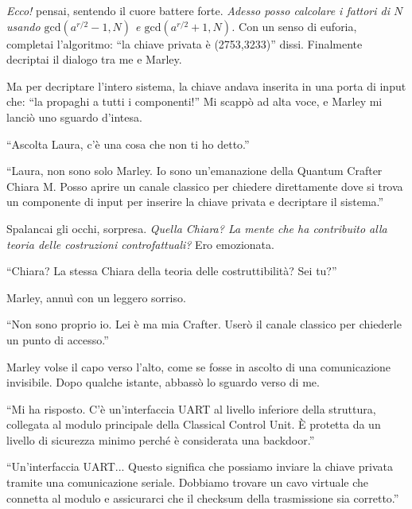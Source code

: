 \emph{Ecco!} pensai, sentendo il cuore battere forte. \emph{Adesso posso calcolare i fattori di \( N \) usando \(\text{gcd}(a^{r/2} - 1, N)\) e \(\text{gcd}(a^{r/2} + 1, N)\).} Con un senso di euforia, completai l'algoritmo: ``la chiave privata è  (2753,3233)'' dissi.
Finalmente decriptai il dialogo tra me e Marley.

Ma per decriptare l'intero sistema, la chiave andava inserita  in una porta di input che: ``la propaghi a tutti i componenti!'' Mi scappò ad alta voce, e Marley mi lanciò uno sguardo d'intesa.
\begin{dialogue}
 \enquote{Ascolta Laura, c'è una cosa che non ti ho detto.}
\end{dialogue}

\begin{dialogue}
 \enquote{Laura, non sono solo Marley. Io sono un'emanazione della Quantum Crafter Chiara M. Posso aprire un canale classico per chiedere direttamente dove si trova un componente di input per inserire la chiave privata e decriptare il sistema.}
\end{dialogue}

Spalancai gli occhi, sorpresa. \emph{Quella Chiara? La mente che ha contribuito alla teoria delle costruzioni controfattuali?} Ero emozionata.

\begin{dialogue}
 \enquote{Chiara? La stessa Chiara  della teoria delle costruttibilità? Sei tu?}
\end{dialogue}

Marley, annuì con un leggero sorriso. 

\begin{dialogue}
 \enquote{Non sono proprio io. Lei è ma mia Crafter. Userò il canale classico per chiederle un punto di accesso.}
\end{dialogue}

Marley volse il capo verso l'alto, come se fosse in ascolto di una comunicazione invisibile. Dopo qualche istante, abbassò lo sguardo verso di me.

\begin{dialogue}
 \enquote{Mi ha risposto. C'è un'interfaccia UART al livello inferiore della struttura, collegata al modulo principale della Classical Control Unit. È protetta da un livello di sicurezza minimo perché è considerata una backdoor.}
\end{dialogue}

\begin{dialogue}
 \enquote{Un'interfaccia UART... Questo significa che possiamo inviare la chiave privata tramite una comunicazione seriale. Dobbiamo trovare un cavo virtuale che connetta al modulo e assicurarci che il checksum della trasmissione sia corretto.}
\end{dialogue}

